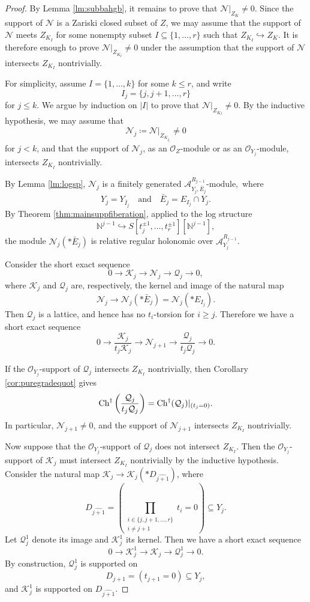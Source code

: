 \documentclass{amsart}
\theoremstyle{plain}
\numberwithin{theorem}{section}
\theoremstyle{definition}
\theoremstyle{remark}
\theoremstyle{definition}
\newcommand{\N}{\mathbb{N}}
\newcommand{\cK}{\mathcal{K}}
\newcommand{\cN}{\mathcal{N}}
\newcommand{\cO}{\mathscr{O}}
\newcommand{\cQ}{\mathcal{Q}}
\newcommand{\sA}{\mathscr{A}}
\newcommand{\Ch}{\textup{Ch}}
\begin{document}
\begin{proof}
By Lemma \ref{lm:subbahgb}, it remains to prove that
$\cN|_{Z_K}\neq 0.$
Since the support of $\cN$ is a Zariski closed subset of $Z$, we may assume
that the support of $\cN$ meets $Z_{K_I}$ for some nonempty subset
$I\subseteq \{1,\dots,r\}$
such that
$Z_{K_I}\hookrightarrow Z_K.$
It is therefore enough to prove
$\cN|_{Z_{K_I}}\neq 0$
under the assumption that the support of $\cN$ intersects $Z_{K_I}$
nontrivially.

For simplicity, assume
$I=\{1,\dots,k\}$
for some $k\le r$, and write
\[
I_j=\{j,j+1,\dots,r\}
\]
for $j\le k$. We argue by induction on $|I|$ to prove that
$\cN|_{Z_{K_I}}\neq 0.$
By the inductive hypothesis, we may assume that
\[
\cN_j
\coloneqq
\cN|_{Z_{K_{\bar I_j}}}
\neq 0
\]
for $j<k$, and that the support of $\cN_j$, as an $\cO_Z$-module or as an
$\cO_{Y_j}$-module, intersects $Z_{K_I}$ nontrivially.

By Lemma \ref{lm:logsp}, $\cN_j$ is a finitely generated
$\sA_{Y_j,\bar E_j}^{R_{j-1}}\text{-module},$
where
\[
Y_j=Y_{\bar I_j}
\quad \text{and} \quad
\bar E_j=E_{I_j}\cap Y_j.
\]
By Theorem \ref{thm:mainsuppfiberation}, applied to the log structure
\[
\N^{j-1}
\hookrightarrow
S[t_j^{\pm1},\dots,t_r^{\pm1}][\N^{j-1}],
\]
the module $\cN_j(*\bar E_j)$ is relative regular holonomic over
$\sA_{Y_j}^{R_{j-1}}$.

Consider the short exact sequence
\[
0
\to
\cK_j
\to
\cN_j
\to
\cQ_j
\to
0,
\]
where $\cK_j$ and $\cQ_j$ are, respectively, the kernel and image of the
natural map
\[
\cN_j\to \cN_j(*\bar E_j)=\cN_j(*E_{I_j}).
\]
Then $\cQ_j$ is a lattice, and hence has no $t_i$-torsion for $i\ge j$.
Therefore we have a short exact sequence
\[
0
\to
\frac{\cK_j}{t_j\cK_j}
\to
\cN_{j+1}
\to
\frac{\cQ_j}{t_j\cQ_j}
\to
0.
\]

If the $\cO_{Y_j}$-support of $\cQ_j$ intersects $Z_{K_I}$ nontrivially, then
Corollary \ref{cor:puregradequot} gives
\[
\Ch^\dagger\left(\frac{\cQ_j}{t_j\cQ_j}\right)
=
\Ch^\dagger(\cQ_j)|_{(t_j=0)}.
\]
In particular, $\cN_{j+1}\neq 0$, and the support of $\cN_{j+1}$ intersects
$Z_{K_I}$ nontrivially.

Now suppose that the $\cO_{Y_j}$-support of $\cQ_j$ does not intersect
$Z_{K_I}$. Then the $\cO_{Y_j}$-support of $\cK_j$ must intersect $Z_{K_I}$
nontrivially by the inductive hypothesis. Consider the natural map
$\cK_j\to \cK_j(*D_{\widehat{j+1}})$,
where
\[
D_{\widehat{j+1}}
=
\left(
\prod_{\substack{i\in\{j,j+1,\dots,r\}\\ i\neq j+1}}t_i=0
\right)
\subseteq Y_j.
\]
Let $\cQ_j^1$ denote its image and $\cK_j^1$ its kernel. Then we have a short
exact sequence
\begin{equation}\label{eq:aaabbbses123}
0
\to
\cK_j^1
\to
\cK_j
\to
\cQ_j^1
\to
0.
\end{equation}
By construction, $\cQ_j^1$ is supported on
\[
D_{j+1}=(t_{j+1}=0)\subseteq Y_j,
\]
and $\cK_j^1$ is supported on $D_{\widehat{j+1}}$.


\end{proof}
\end{document}
